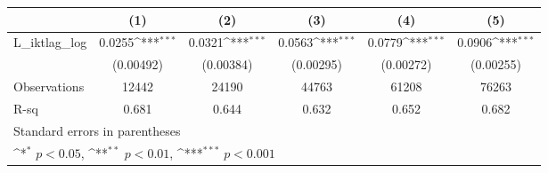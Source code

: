 {
\def\sym#1{\ifmmode^{#1}\else\(^{#1}\)\fi}
\begin{tabular}{l*{5}{c}}
\hline\hline
                &\multicolumn{1}{c}{(1)}         &\multicolumn{1}{c}{(2)}         &\multicolumn{1}{c}{(3)}         &\multicolumn{1}{c}{(4)}         &\multicolumn{1}{c}{(5)}         \\
\hline
L\_iktlag\_log    &   0.0255\sym{***}&   0.0321\sym{***}&   0.0563\sym{***}&   0.0779\sym{***}&   0.0906\sym{***}\\
                &(0.00492)         &(0.00384)         &(0.00295)         &(0.00272)         &(0.00255)         \\
\hline
Observations    &    12442         &    24190         &    44763         &    61208         &    76263         \\
R-sq            &    0.681         &    0.644         &    0.632         &    0.652         &    0.682         \\
\hline\hline
\multicolumn{6}{l}{\footnotesize Standard errors in parentheses}\\
\multicolumn{6}{l}{\footnotesize \sym{*} \(p<0.05\), \sym{**} \(p<0.01\), \sym{***} \(p<0.001\)}\\
\end{tabular}
}
